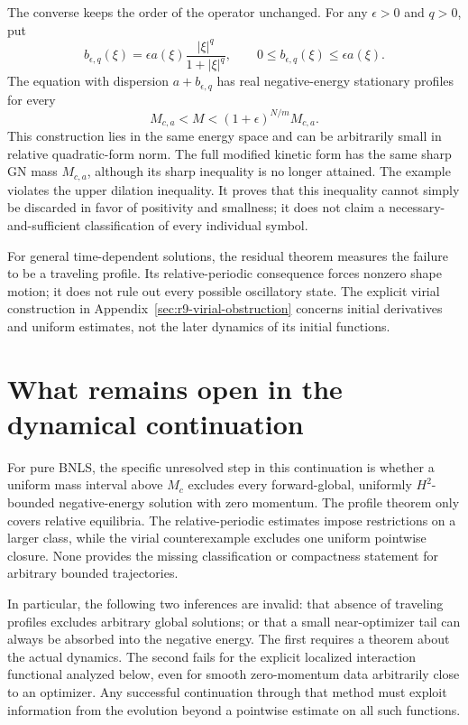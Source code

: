 \documentclass[11pt,a4paper]{article}
\theoremstyle{remark}\newtheorem{remark}[theorem]{Remark}
\begin{document}
The converse keeps the order of the operator unchanged. For any $\epsilon>0$ and $q>0$, put
\[
 b_{\epsilon,q}(\xi)=\epsilon a(\xi)\frac{|\xi|^q}{1+|\xi|^q},
 \qquad 0\le b_{\epsilon,q}(\xi)\le\epsilon a(\xi).
\]
The equation with dispersion $a+b_{\epsilon,q}$ has real negative-energy stationary profiles for every
\[
 M_{c,a}<M<(1+\epsilon)^{N/m}M_{c,a}.
\]
This construction lies in the same energy space and can be arbitrarily small in relative quadratic-form norm. The full modified kinetic form has the same sharp GN mass $M_{c,a}$, although its sharp inequality is no longer attained. The example violates the upper dilation inequality. It proves that this inequality cannot simply be discarded in favor of positivity and smallness; it does not claim a necessary-and-sufficient classification of every individual symbol.

For general time-dependent solutions, the residual theorem measures the failure to be a traveling profile. Its relative-periodic consequence forces nonzero shape motion; it does not rule out every possible oscillatory state. The explicit virial construction in Appendix~\ref{sec:r9-virial-obstruction} concerns initial derivatives and uniform estimates, not the later dynamics of its initial functions.





\section{What remains open in the dynamical continuation}
For pure BNLS, the specific unresolved step in this continuation is whether a uniform mass interval above $M_c$ excludes every forward-global, uniformly $H^2$-bounded negative-energy solution with zero momentum. The profile theorem only covers relative equilibria. The relative-periodic estimates impose restrictions on a larger class, while the virial counterexample excludes one uniform pointwise closure. None provides the missing classification or compactness statement for arbitrary bounded trajectories.

In particular, the following two inferences are invalid: that absence of traveling profiles excludes arbitrary global solutions; or that a small near-optimizer tail can always be absorbed into the negative energy. The first requires a theorem about the actual dynamics. The second fails for the explicit localized interaction functional analyzed below, even for smooth zero-momentum data arbitrarily close to an optimizer. Any successful continuation through that method must exploit information from the evolution beyond a pointwise estimate on all such functions.
\end{document}
